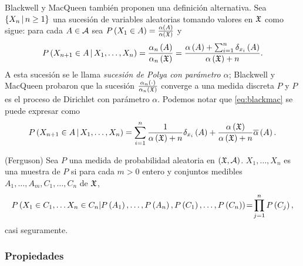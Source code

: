 \documentclass[runningheads,a4paper]{article}
\begin{document}
Blackwell y MacQueen también proponen una definición alternativa. Sea $\left\{ X_{n} \,|\, n \geq 1 \right\}$ una sucesión de variables %
aleatorias tomando valores en $\mathfrak{X}$ como sigue: para cada $A \in \mathcal{A}$ sea $P\Pp{X_{1} \in A} = \frac{\alpha\Pp{A}}{\alpha\Pp{%
\X}}$ y 
\begin{equation} \label{eq:blackmac}
P\Pp{X_{n+1} \in A \,|\, X_{1}, \ldots, X_{n}} = \frac{\alpha_{n}\Pp{A}}{\alpha_{n}\Pp{\X}} %
                                               = \frac{\alpha\Pp{A} + \sum_{i = 1}^{n} \delta_{x_{i}}\Pp{A}}{\alpha\Pp{\X} + n}.
\end{equation}
A esta sucesión se le llama \textit{sucesión de Polya con parámetro $\alpha$}; Blackwell y MacQueen probaron que la sucesión %
$\frac{\alpha_{n}\left( \cdot \right)}{\alpha_{n}\left( \mathfrak{X} \right)}$ converge a una medida discreta $P$ y $P$ es el proceso de Dirichlet con %
parámetro $\alpha$. Podemos notar que \eqref{eq:blackmac} se puede expresar como
\[
P\left( X_{n+1} \in A \,|\, X_{1}, \ldots, X_{n} \right) = \sum_{i = 1}^{n} \frac{1}{\alpha\left( \mathfrak{X} \right) + n} \delta_{x_{i}}\left( A \right) + 
                                                \frac{\alpha\left( \mathfrak{X} \right)}{\alpha\left( \mathfrak{X} \right) + n} \overline{\alpha}\left( A \right).
\]

\begin{defi}(Ferguson)
Sea $P$ una medida de probabilidad aleatoria en $\left( \mathfrak{X}, \mathcal{A} \right)$. $X_{1}, \ldots, X_{n}$ es una muestra de $P$ si para cada $m %
> 0$ entero y conjuntos medibles $A_{1}, \ldots, A_{m}, C_{1}, \ldots, C_{n}$ de $\mathfrak{X}$,
\[
P\Pp{X_{1} \in C_{1}, \ldots X_{n} \in C_{n} | P\Pp{A_{1}}, \ldots, P\Pp{A_{n}}, P\Pp{C_{1}}, \ldots, P\Pp{C_{n}}} %
 \!=\! \prod_{j = 1}^{n} P\Pp{C_{j}},
\]
casi seguramente.
\end{defi}

\subsubsection{Propiedades}
\end{document}
